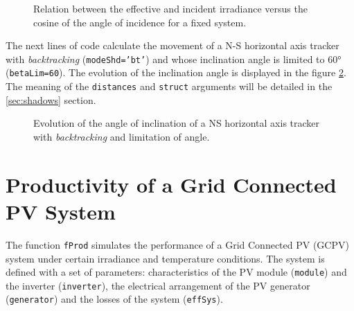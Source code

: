 \documentclass[a4paper]{article}
\renewenvironment{Schunk}{\vspace{\topsep}}{\vspace{\topsep}}
\newcommand{\code}[1]{{\texttt{#1}}}
\begin{document}
%
\begin{figure}
\begin{centering}
\par\end{centering}
\caption{Relation between the effective and incident irradiance versus
  the cosine of the angle of incidence for a fixed
  system.\label{fig:GefG0vsTheta}}
\end{figure}

The next lines of code calculate the movement of a N-S horizontal axis
tracker with \emph{backtracking} (\code{modeShd='bt'}) and whose
inclination angle is limited to $\ang{60}$ (\code{betaLim=60}). The
evolution of the inclination angle is displayed in the figure
\ref{fig:Backtracking}. The meaning of the \code{distances} and
\code{struct} arguments will be detailed in the \ref{sec:shadows}
section.

\begin{Schunk}
\end{Schunk}

\begin{figure}
\begin{centering}
\par\end{centering}

\caption{Evolution of the angle of inclination of a NS horizontal axis tracker with \emph{backtracking} and limitation of angle. \label{fig:Backtracking}}

\end{figure}


\section{Productivity of a Grid Connected PV System}
\label{sec:gcpv}

The function \code{fProd}
simulates the performance of a Grid Connected PV (GCPV) system under
certain irradiance and temperature conditions. The system is defined
with a set of parameters: characteristics of the PV
module (\code{module}) and the inverter (\code{inverter}), the electrical arrangement of the PV
generator (\code{generator}) and the losses of the system (\code{effSys}).
\end{document}
